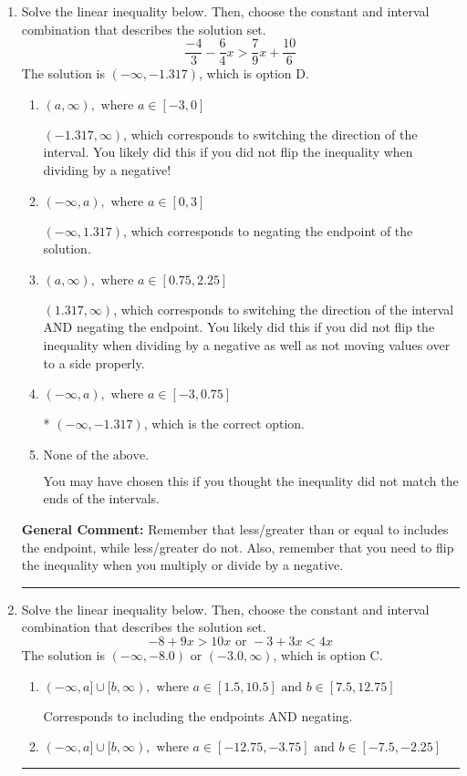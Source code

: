 \documentclass{extbook}[14pt]
\newcommand{\litem}[1]{\item #1

\rule{\textwidth}{0.4pt}}
\begin{document}
\begin{enumerate}\litem{
Solve the linear inequality below. Then, choose the constant and interval combination that describes the solution set.
\[ \frac{-4}{3} - \frac{6}{4} x > \frac{7}{9} x + \frac{10}{6} \]The solution is \( (-\infty, -1.317) \), which is option D.\begin{enumerate}[label=\Alph*.]
\item \( (a, \infty), \text{ where } a \in [-3, 0] \)

 $(-1.317, \infty)$, which corresponds to switching the direction of the interval. You likely did this if you did not flip the inequality when dividing by a negative!
\item \( (-\infty, a), \text{ where } a \in [0, 3] \)

 $(-\infty, 1.317)$, which corresponds to negating the endpoint of the solution.
\item \( (a, \infty), \text{ where } a \in [0.75, 2.25] \)

 $(1.317, \infty)$, which corresponds to switching the direction of the interval AND negating the endpoint. You likely did this if you did not flip the inequality when dividing by a negative as well as not moving values over to a side properly.
\item \( (-\infty, a), \text{ where } a \in [-3, 0.75] \)

* $(-\infty, -1.317)$, which is the correct option.
\item \( \text{None of the above}. \)

You may have chosen this if you thought the inequality did not match the ends of the intervals.
\end{enumerate}

\textbf{General Comment:} Remember that less/greater than or equal to includes the endpoint, while less/greater do not. Also, remember that you need to flip the inequality when you multiply or divide by a negative.
}
\litem{
Solve the linear inequality below. Then, choose the constant and interval combination that describes the solution set.
\[ -8 + 9 x > 10 x \text{ or } -3 + 3 x < 4 x \]The solution is \( (-\infty, -8.0) \text{ or } (-3.0, \infty) \), which is option C.\begin{enumerate}[label=\Alph*.]
\item \( (-\infty, a] \cup [b, \infty), \text{ where } a \in [1.5, 10.5] \text{ and } b \in [7.5, 12.75] \)

Corresponds to including the endpoints AND negating.
\item \( (-\infty, a] \cup [b, \infty), \text{ where } a \in [-12.75, -3.75] \text{ and } b \in [-7.5, -2.25] \)


\end{enumerate}}
\end{enumerate}
\end{document}
